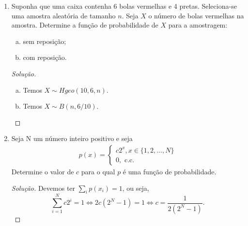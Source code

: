 \documentclass[../Notas.tex]{subfiles}
\begin{document}
\begin{enumerate}
\begin{proof}[Solução]
\begin{enumerate}[a)]
\[            \]
            ou seja, $Y\sim B(n, 1-p)$.
            \item Temos
            \[
            p_Y(k) = \begin{cases}
            (1-p)^kp, k = 0, 1, \dots \\
            0, \text{c.c.}
            \end{cases}.
            \]
            \item Temos
            \[
            p_Y(k) = \begin{cases}
            \binom{r+k-1}{r-1}p^r(1-p)^{k}, k = 0, 1, \dots \\
            0, \text{c.c.}
            \end{cases}.
            \]
        \end{enumerate}
    \end{proof}
    \item Suponha que uma caixa contenha 6 bolas vermelhas e 4 pretas. Seleciona-se uma amostra aleatória de tamanho $n$. Seja $X$ o número de bolas vermelhas na amostra. Determine a função de probabilidade de $X$ para a amostragem:
    \begin{enumerate}[a)]
    \item sem reposição;
    \item com reposição.
    \end{enumerate}
    \begin{proof}[Solução]
        \begin{enumerate}[a)]
            \item Temos $X\sim Hgeo(10,6,n)$.
            \item Temos $X\sim B(n, 6/10)$.
        \end{enumerate}
    \end{proof}
    \item Seja N um número inteiro positivo e seja
    \begin{align*}
        p(x) = \begin{cases}
        c2^x, x\in\{1, 2, \dots, N\} \\
        0, \text{ c.c.}
        \end{cases}
    \end{align*}
    Determine o valor de $c$ para o qual $p$ é uma função de probabilidade.
    \begin{proof}[Solução]
        Devemos ter $\sum_i p(x_i) = 1$, ou seja,
        \[
        \sum_{i=1}^N c2^i = 1 \iff 2c(2^N - 1) = 1 \iff c = \frac{1}{2(2^N - 1)}.
\]
\end{proof}
\end{enumerate}
\end{document}
